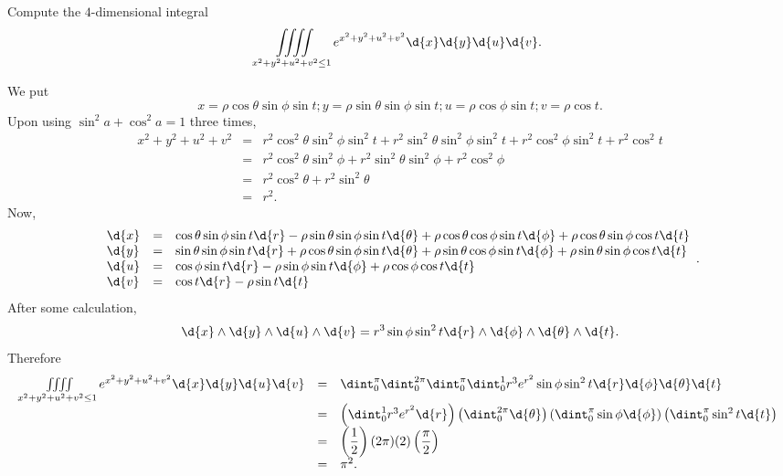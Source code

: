 \begin{pro}
Compute the $4$-dimensional integral
$$\iiiint\limits_{x^2 + y^2 + u^2 + v^2 \leq 1} e^{x^2 + y^2 + u^2 + v^2 } \d{x}\d{y}\d{u}\d{v}.   $$
\begin{answer} We put $$x = \rho\cos \theta\sin\phi\sin t; y
=\rho\sin\theta\sin\phi\sin t; u =\rho\cos \phi\sin t; v = \rho\cos
t.
$$ Upon using $\sin^2a+\cos^2a = 1$ three times,
$$\begin{array}{lll}x^2+y^2+u^2+v^2 & =
&r^2\cos^2\theta\sin^2\phi\sin^2 t+r^2\sin^2\theta\sin^2\phi\sin^2t
+ r^2\cos^2\phi\sin^2 t + r^2\cos^2 t \\
& = &r^2\cos^2\theta\sin^2\phi+r^2\sin^2\theta\sin^2\phi
+ r^2\cos^2\phi \\
& = &r^2\cos^2\theta+r^2\sin^2\theta \\
& = & r^2.
\end{array}$$
Now,
$$\begin{array}{lll}\d{x} & = & \cos\theta\sin\phi\sin t\d{r} -\rho\sin\theta\sin\phi\sin t\d{\theta} + \rho\cos \theta\cos\phi\sin t\d{\phi}
+ \rho\cos \theta\sin\phi\cos t\d{t} \\
\d{y} & = & \sin\theta\sin\phi\sin t\d{r} +\rho\cos
\theta\sin\phi\sin t\d{\theta} + \rho\sin\theta\cos\phi\sin
t\d{\phi} +
\rho\sin\theta\sin\phi\cos t\d{t} \\
\d{u} & = & \cos\phi\sin t\d{r} -\rho\sin\phi\sin t\d{\phi} + \rho\cos \phi\cos t\d{t}\\
\d{v}  & = & \cos t\d{r} - \rho\sin t\d{t}   \end{array}.$$After
some calculation,
$$ \d{x}\wedge\d{y}\wedge\d{u}\wedge\d{v} = r^3\sin\phi\sin^2t\d{r}\wedge\d{\phi}\wedge\d{\theta}\wedge\d{t}. $$
Therefore
$$\begin{array}{lll}\iiiint\limits_{x^2 + y^2 + u^2 + v^2 \leq 1} e^{x^2 + y^2 + u^2 + v^2 } \d{x}\d{y}\d{u}\d{v} & = &
\dint _{0} ^{\pi}\dint _0 ^{2\pi}\dint _0 ^\pi\dint _0 ^1
r^3e^{r^2}\sin\phi\sin^2t\d{r}\d{\phi}\d{\theta}\d{t} \\ & = &
\left(\dint _{0} ^{1} r^3e^{r^2}\d{r}\right)\left(\dint _{0} ^{2\pi}
\d{\theta}\right)\left(\dint _{0} ^{\pi}\sin\phi
\d{\phi}\right)\left(\dint _{0} ^{\pi}\sin^2t
\d{t}\right)\\
& = &
\left(\dfrac{1}{2}\right)(2\pi)(2)\left(\dfrac{\pi}{2}\right) \\
& = & \pi^2.
\end{array}$$

\end{answer}
\end{pro}

